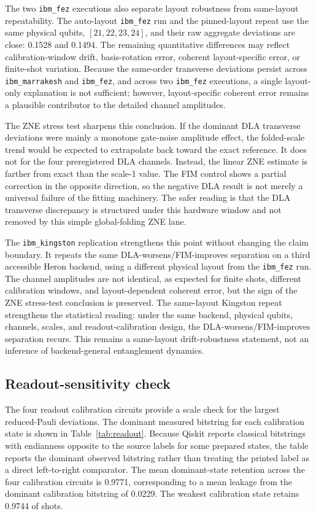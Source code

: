 \documentclass[preprint,aps,physrev,superscriptaddress,floatfix,longbibliography]{revtex4-2}
\begin{document}
The two \texttt{ibm\_fez} executions also separate layout robustness from
same-layout repeatability. The auto-layout \texttt{ibm\_fez} run and the
pinned-layout repeat use the same physical qubits, $[21,22,23,24]$, and their
raw aggregate deviations are close: 0.1528 and 0.1494. The remaining
quantitative differences may reflect calibration-window drift, basis-rotation
error, coherent layout-specific error, or finite-shot variation. Because the
same-order transverse deviations persist across \texttt{ibm\_marrakesh} and
\texttt{ibm\_fez}, and across two \texttt{ibm\_fez} executions, a single
layout-only explanation is not sufficient; however, layout-specific coherent
error remains a plausible contributor to the detailed channel amplitudes.

The ZNE stress test sharpens this conclusion. If the dominant DLA transverse
deviations were mainly a monotone gate-noise amplitude effect, the folded-scale
trend would be expected to extrapolate back toward the exact reference. It
does not for the four preregistered DLA channels. Instead, the linear ZNE
estimate is farther from exact than the scale-1 value. The FIM control shows a
partial correction in the opposite direction, so the negative DLA result is
not merely a universal failure of the fitting machinery. The safer reading is
that the DLA transverse discrepancy is structured under this hardware window
and not removed by this simple global-folding ZNE lane.

The \texttt{ibm\_kingston} replication strengthens this point without changing
the claim boundary. It repeats the same DLA-worsens/FIM-improves separation on
a third accessible Heron backend, using a different physical layout from the
\texttt{ibm\_fez} run. The channel amplitudes are not identical, as expected
for finite shots, different calibration windows, and layout-dependent coherent
error, but the sign of the ZNE stress-test conclusion is preserved. The
same-layout Kingston repeat strengthens the statistical reading: under the
same backend, physical qubits, channels, scales, and readout-calibration
design, the DLA-worsens/FIM-improves separation recurs. This remains a
same-layout drift-robustness statement, not an inference of backend-general
entanglement dynamics.

\subsection{Readout-sensitivity check}

The four readout calibration circuits provide a scale check for the largest
reduced-Pauli deviations. The dominant measured bitstring for each calibration
state is shown in Table~\ref{tab:readout}. Because Qiskit reports classical
bitstrings with endianness opposite to the source labels for some prepared
states, the table reports the dominant observed bitstring rather than treating
the printed label as a direct left-to-right comparator. The mean dominant-state
retention across the four calibration circuits is 0.9771, corresponding to a
mean leakage from the dominant calibration bitstring of 0.0229. The weakest
calibration state retains 0.9744 of shots.
\end{document}
